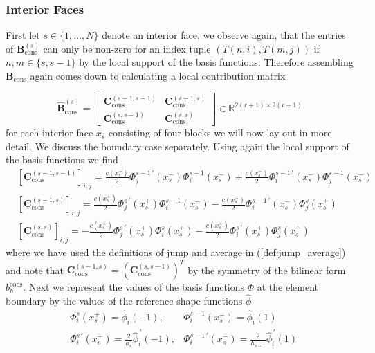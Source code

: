 \subsubsection{Interior Faces}
First let $s \in \{1,\ldots,N\}$ denote an interior face, we observe again, that the entries of 
$\textbf{B}_{\text{cons}}^{(s)}$ can only be non-zero for an index tuple $(T(n,i),T(m,j))$ if 
$n,m \in \{s, s-1\}$ by the local support of the basis functions.
Therefore assembling $ \textbf{B}_{\text{cons}}$ again comes down to calculating a local contribution matrix 

\begin{equation*}
    \widehat{\textbf{B}}_{\text{cons}}^{(s)} = 
    \begin{bmatrix}
        \textbf{C}_{\text{cons}}^{(s-1,s-1)} & \textbf{C}_{\text{cons}}^{(s-1,s)} \\
        \textbf{C}_{\text{cons}}^{(s,s-1)} & \textbf{C}_{\text{cons}}^{(s,s)} 
    \end{bmatrix}
    \in \mathbb{R}^{2(r+1) \times 2(r+1)}
\end{equation*}
for each interior face $x_s$ consisting of four blocks we will now lay out in more detail.
We discuss the boundary case separately.
Using again the local support of the basis functions we find
\begin{align*}
    &[\textbf{C}_{\text{cons}}^{(s-1,s-1)}]_{i,j} = \frac{c(x_s^-)}{2} \Phi_j^{s-1\, \prime}(x_s^-) \Phi_i^{s-1}(x_s^-) + \frac{c(x_s^-)}{2} \Phi_i^{s-1\, \prime}(x_s^-) \Phi_j^{s-1}(x_s^-) \\
    &[\textbf{C}_{\text{cons}}^{(s-1,s)}]_{i,j} = \frac{c(x_s^+)}{2} \Phi_j^{s\, \prime}(x_s^+) \Phi_i^{s-1}(x_s^-) - \frac{c(x_s^-)}{2} \Phi_i^{s-1\, \prime}(x_s^-) \Phi_j^{s}(x_s^+) \\
    &[\textbf{C}_{\text{cons}}^{(s,s)}]_{i,j} = -\frac{c(x_s^+)}{2} \Phi_j^{s\, \prime}(x_s^+) \Phi_i^{s}(x_s^+) - \frac{c(x_s^+)}{2} \Phi_i^{s\, \prime}(x_s^+) \Phi_j^{s}(x_s^+)
\end{align*}
where we have used the definitions of jump and average in (\ref{def:jump_average})
and note that $ \textbf{C}_{\text{cons}}^{(s-1,s)} = (\textbf{C}_{\text{cons}}^{(s,s-1)})^T$ by the symmetry of the bilinear form $b_h^{\text{cons}}$.
Next we represent the values of the basis functions $ \Phi $ at the element boundary by the values of the reference 
shape functions $\widehat{\phi}$
\begin{align}
    & \Phi_i^s(x_s^+) = \widehat{\phi}_i(-1) , & \Phi^{s-1}_i(x_s^-) = \widehat{\phi}_i(1) \label{eq:shape_fun_and_basis_fun_values_equality}\\ 
    & \Phi_i^{s\, \prime }(x_s^+) = \frac{2}{h_{s}} \widehat{\phi}_i^{\,\prime}(-1), 
    & \Phi_i^{s-1\, \prime }(x_s^-) = \frac{2}{h_{s-1}} \widehat{\phi}_i^{\,\prime}(1) \nonumber
\end{align}
